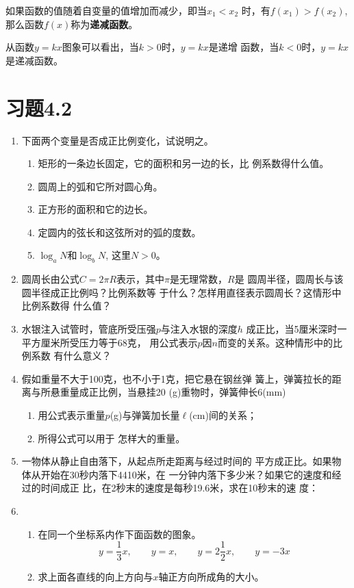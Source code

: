 如果函数的值随着自变量的值增加而减少，即当$x_1<x_2$
时，有$f(x_1)>f(x_2)$, 那么函数$f(x)$称为\textbf{递减函数}。

从函数$y=kx$图象可以看出，当$k>0$时，$y=kx$是递增
函数，当$k<0$时，$y=kx$是递减函数。

\section*{习题4.2}
\begin{enumerate}
    \item   下面两个变量是否成正比例变化，试说明之。
\begin{enumerate}
\item 矩形的一条边长固定，它的面积和另一边的长，比
    例系数得什么值。
    \item 圆周上的弧和它所对圆心角。
    \item 正方形的面积和它的边长。
    \item 定圆内的弦长和这弦所对的弧的度数。
    \item $\log_a N$和$\log_b N$, 这里$N>0$。
\end{enumerate}

    \item 圆周长由公式$C=2\pi R$表示，其中$\pi$是无理常数，$R$是
    圆周半径，圆周长与该圆半径成正比例吗？比例系数等
    于什么？怎样用直径表示圆周长？这情形中比例系数得
    什么值？
    \item 水银注入试管时，管底所受压强$p$与注入水银的深度$h$
    成正比，当5厘米深时一平方厘米所受压力等于68克，
    用公式表示$p$因$n$而变的关系。这种情形中的比例系数
    有什么意义？
    \item 
    假如重量不大于100克，也不小于1克，把它悬在钢丝弹
    簧上，弹簧拉长的距离与所悬重量成正比例，当悬挂20
    (g)重物时，弹簧伸长6(mm)
\begin{enumerate}
    \item 用公式表示重量$p$(g)与弹簧加长量$\ell$(cm)间的关系；
    \item 所得公式可以用于
    怎样大的重量。
\end{enumerate}    

    \item 一物体从静止自由落下，从起点所走距离与经过时间的
    平方成正比。如果物体从开始在30秒内落下4410米，在
    一分钟内落下多少米？如果它的速度和经过的时间成正
    比，在2秒末的速度是每秒19.6米，求在10秒末的速
度：
\item \begin{enumerate}
    \item 在同一个坐标系内作下面函数的图象。
    \[y=\frac{1}{3}x,\qquad     y=x,\qquad y=2\frac{1}{2}x,\qquad     y=-3x\]
    \item 求上面各直线的向上方向与$x$轴正方向所成角的大小。
\end{enumerate} 



\end{enumerate}
